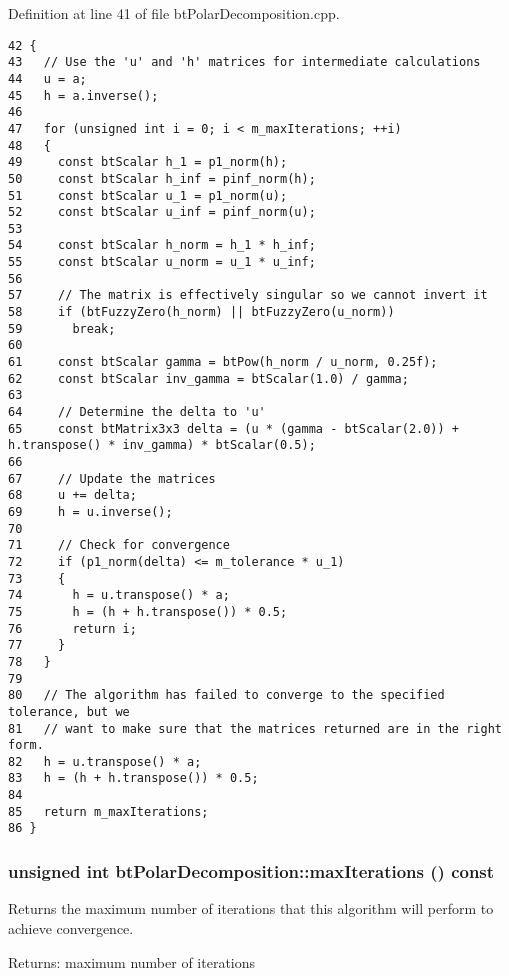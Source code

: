 Definition at line 41 of file btPolarDecomposition.cpp.

\begin{Code}\begin{verbatim}42 {
43   // Use the 'u' and 'h' matrices for intermediate calculations
44   u = a;
45   h = a.inverse();
46 
47   for (unsigned int i = 0; i < m_maxIterations; ++i)
48   {
49     const btScalar h_1 = p1_norm(h);
50     const btScalar h_inf = pinf_norm(h);
51     const btScalar u_1 = p1_norm(u);
52     const btScalar u_inf = pinf_norm(u);
53 
54     const btScalar h_norm = h_1 * h_inf;
55     const btScalar u_norm = u_1 * u_inf;
56 
57     // The matrix is effectively singular so we cannot invert it
58     if (btFuzzyZero(h_norm) || btFuzzyZero(u_norm))
59       break;
60 
61     const btScalar gamma = btPow(h_norm / u_norm, 0.25f);
62     const btScalar inv_gamma = btScalar(1.0) / gamma;
63 
64     // Determine the delta to 'u'
65     const btMatrix3x3 delta = (u * (gamma - btScalar(2.0)) + h.transpose() * inv_gamma) * btScalar(0.5);
66 
67     // Update the matrices
68     u += delta;
69     h = u.inverse();
70 
71     // Check for convergence
72     if (p1_norm(delta) <= m_tolerance * u_1)
73     {
74       h = u.transpose() * a;
75       h = (h + h.transpose()) * 0.5;
76       return i;
77     }
78   }
79 
80   // The algorithm has failed to converge to the specified tolerance, but we
81   // want to make sure that the matrices returned are in the right form.
82   h = u.transpose() * a;
83   h = (h + h.transpose()) * 0.5;
84 
85   return m_maxIterations;
86 }
\end{verbatim}
\end{Code}


\hypertarget{classbt_polar_decomposition_c999bd3afdcc94a43ddbea028b5d4867}{
\subsubsection[maxIterations]{\setlength{\rightskip}{0pt plus 5cm}unsigned int btPolarDecomposition::maxIterations () const}}
\label{classbt_polar_decomposition_c999bd3afdcc94a43ddbea028b5d4867}


Returns the maximum number of iterations that this algorithm will perform to achieve convergence.

\begin{Desc}
\item[Returns:]maximum number of iterations \end{Desc}


